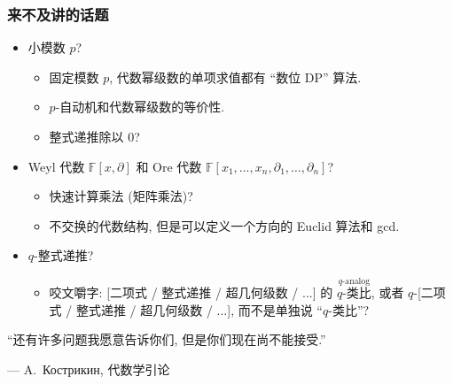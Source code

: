 \documentclass{ctexbeamer}
\newcommand{\bbF}{\mathbb F}
\begin{document}
\begin{frame}
  \frametitle{来不及讲的话题}

  \begin{itemize}
    \item 小模数 $p$?
    \begin{itemize}
      \item 固定模数 $p$, 代数幂级数的单项求值都有 ``数位 DP'' 算法.
      \item $p$-自动机和代数幂级数的等价性.
      \item 整式递推除以 $0$?
    \end{itemize}
    \item Weyl 代数 $\bbF[x, \partial]$ 和 Ore 代数 $\bbF[x_1,\dots,x_n, \partial_1,\dots,\partial_n]$?
    \begin{itemize}
      \item 快速计算乘法 (矩阵乘法)?
      \item 不交换的代数结构, 但是可以定义一个方向的 Euclid 算法和 gcd.
    \end{itemize}
    \item $q$-整式递推?
    \begin{itemize}
      \item 咬文嚼字: [二项式 / 整式递推 / 超几何级数 / ...] 的 $\stackrel{q\text{-analog}}{q\text{-类比}}$,
      或者 $q$-[二项式 / 整式递推 / 超几何级数 / ...],
      而不是单独说 ``$q$-类比''?
    \end{itemize}
  \end{itemize}

  \bigskip

  \begin{center}
    ``还有许多问题我愿意告诉你们, 但是你们现在尚不能接受.''

    \hfill --- A.~Кострикин, 代数学引论
  \end{center}

\end{frame}
\end{document}
